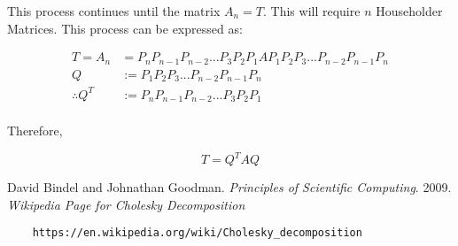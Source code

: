 \documentclass{article}
\begin{document}
		This process continues until the matrix $A_{n}=T$.  This will require $n$ Householder Matrices.  This process can be expressed as:
		
		\begin{align*}
			T=A_{n}&=P_{n}P_{n-1}P_{n-2}...P_{3}P_{2}P_{1}AP_{1}P_{2}P_{3}...P_{n-2}P_{n-1}P_{n}\\
			Q&:=P_{1}P_{2}P_{3}...P_{n-2}P_{n-1}P_{n}\\
			\therefore Q^{T}&:=P_{n}P_{n-1}P_{n-2}...P_{3}P_{2}P_{1}\\
		\end{align*}
		
		Therefore,
		
		\begin{equation}
			T=Q^{T}AQ
		\end{equation}
	
		
		

\newpage

\begin{thebibliography}{2}
	David Bindel and Johnathan Goodman.
	\textit{Principles of Scientific Computing}. 
	2009.
	\textit{Wikipedia Page for Cholesky Decomposition}
	\begin{verbatim}
	https://en.wikipedia.org/wiki/Cholesky_decomposition
	\end{verbatim}
	
\end{thebibliography}
\end{document}
